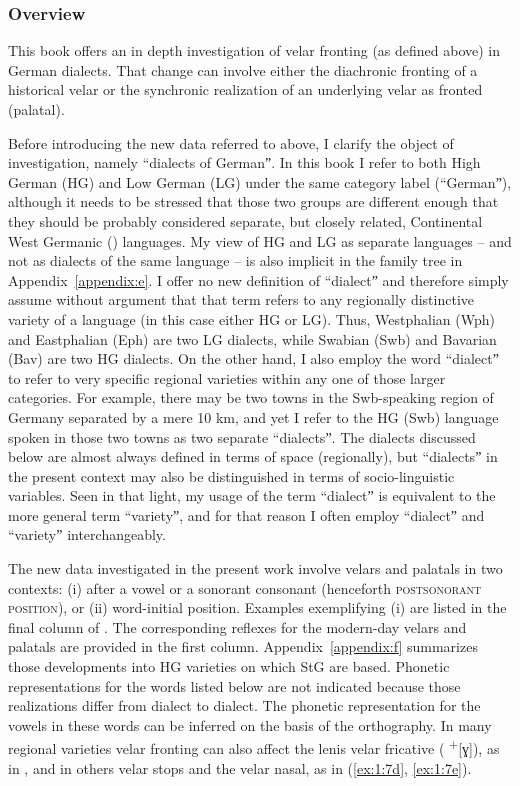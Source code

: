 \subsubsection{Overview}
This book offers an in depth investigation of velar fronting (as defined above) in German dialects. That change can involve either the diachronic fronting of a historical velar or the synchronic realization of an underlying velar as fronted (palatal). 

Before introducing the new data referred to above, I clarify the object of investigation, namely “dialects of Germanˮ. In this book I refer to both High German (HG) and Low German (LG) under the same category label (“Germanˮ), although it needs to be stressed that those two groups are different enough that they should be probably considered separate, but closely related, Continental West Germanic () languages. My view of HG and LG as separate languages -- and not as dialects of the same language -- is also implicit in the family tree in Appendix~\ref{appendix:e}. I offer no new definition of “dialectˮ and therefore simply assume without argument that that term refers to any regionally distinctive variety of a language (in this case either HG or LG). Thus, Westphalian (Wph) and Eastphalian (Eph) are two LG dialects, while Swabian (Swb) and Bavarian (Bav) are two HG dialects. On the other hand, I also employ the word “dialectˮ to refer to very specific regional varieties within any one of those larger categories. For example, there may be two towns in the Swb-speaking region of Germany separated by a mere 10 km, and yet I refer to the HG (Swb) language spoken in those two towns as two separate “dialectsˮ. The dialects discussed below are almost always defined in terms of space (regionally), but “dialectsˮ in the present context may also be distinguished in terms of socio-linguistic variables. Seen in that light, my usage of the term “dialectˮ is equivalent to the more general term “varietyˮ, and for that reason I often employ “dialectˮ and “varietyˮ interchangeably.   

 The new data investigated in the present work involve velars and palatals in two contexts: (i) after a vowel or a sonorant consonant (henceforth \textsc{postsonorant} \textsc{position}), or (ii) word-initial position. Examples exemplifying (i) are listed in the final column of . The corresponding  reflexes for the modern-day velars and palatals are provided in the first column. Appendix~\ref{appendix:f} summarizes those developments into HG varieties on which StG are based. Phonetic representations for the words listed below are not indicated because those realizations differ from dialect to dialect. The phonetic representation for the vowels in these words can be inferred on the basis of the orthography. In many regional varieties velar fronting can also affect the lenis velar fricative ( \textsuperscript{+}[ɣ]), as in , and in others velar stops and the velar nasal, as in (\ref{ex:1:7d}, \ref{ex:1:7e}).

